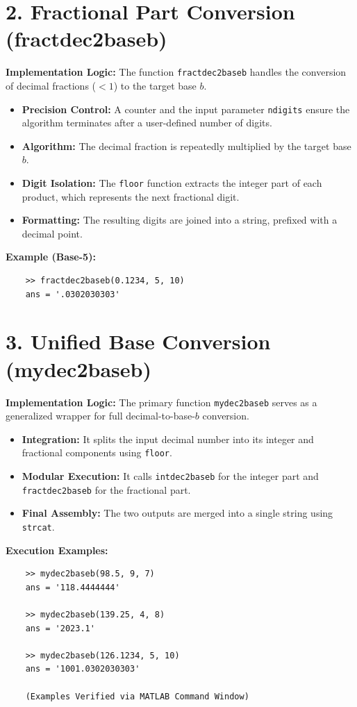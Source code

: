 \documentclass[12pt, a4paper]{article}
\begin{document}
\section*{2. Fractional Part Conversion (fractdec2baseb)}
\textbf{Implementation Logic:} The function \texttt{fractdec2baseb} handles the conversion of decimal fractions ($< 1$) to the target base $b$.

\begin{itemize}[label=--]
	\item \textbf{Precision Control:} A counter and the input parameter \texttt{ndigits} ensure the algorithm terminates after a user-defined number of digits.
	\item \textbf{Algorithm:} The decimal fraction is repeatedly multiplied by the target base $b$.
	\item \textbf{Digit Isolation:} The \texttt{floor} function extracts the integer part of each product, which represents the next fractional digit.
	\item \textbf{Formatting:} The resulting digits are joined into a string, prefixed with a decimal point.
\end{itemize}

\textbf{Example (Base-5):}
\begin{verbatim}
	>> fractdec2baseb(0.1234, 5, 10)
	ans = '.0302030303'
\end{verbatim}

\section*{3. Unified Base Conversion (mydec2baseb)}
\textbf{Implementation Logic:} The primary function \texttt{mydec2baseb} serves as a generalized wrapper for full decimal-to-base-$b$ conversion.

\begin{itemize}[label=--]
	\item \textbf{Integration:} It splits the input decimal number into its integer and fractional components using \texttt{floor}.
	\item \textbf{Modular Execution:} It calls \texttt{intdec2baseb} for the integer part and \texttt{fractdec2baseb} for the fractional part.
	\item \textbf{Final Assembly:} The two outputs are merged into a single string using \texttt{strcat}.
\end{itemize}

\textbf{Execution Examples:}
\begin{verbatim}
	>> mydec2baseb(98.5, 9, 7)
	ans = '118.4444444'
	
	>> mydec2baseb(139.25, 4, 8)
	ans = '2023.1'
	
	>> mydec2baseb(126.1234, 5, 10)
	ans = '1001.0302030303'
	
	(Examples Verified via MATLAB Command Window)
\end{verbatim}
\end{document}
